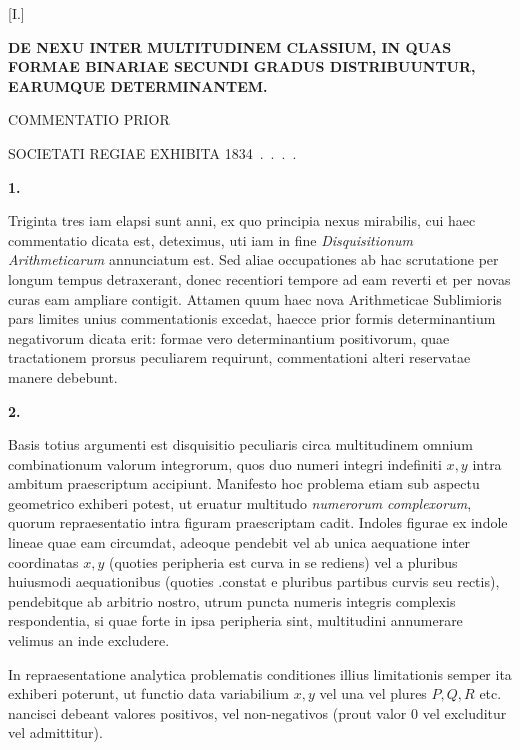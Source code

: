 \clearpage
{}
\renewcommand{\BookRunningTitle}{De nexu inter multitudinem classium}
\renewcommand{\Article}[1]{\par\medskip\Needspace{4\baselineskip}\pdfbookmark[1]{Art. #1}{nexus-prior-art-#1}\centerline{\textbf{#1.}}\nobreak\smallskip}
\begin{center}
[I.]\par\medskip
\Large\bfseries DE NEXU INTER MULTITUDINEM CLASSIUM, IN QUAS FORMAE BINARIAE SECUNDI GRADUS DISTRIBUUNTUR, EARUMQUE DETERMINANTEM.\par\medskip
\normalsize COMMENTATIO PRIOR\par\medskip
SOCIETATI REGIAE EXHIBITA 1834\ .\ .\ .\ .
\end{center}

\Article{1}
Triginta tres iam elapsi sunt anni, ex quo principia nexus mirabilis, cui haec commentatio dicata est, deteximus, uti iam in fine \emph{Disquisitionum Arithmeticarum} annunciatum est. Sed aliae occupationes ab hac scrutatione per longum tempus detraxerant, donec recentiori tempore ad eam reverti et per novas curas eam ampliare contigit. Attamen quum haec nova Arithmeticae Sublimioris pars limites unius commentationis excedat, haecce prior formis determinantium negativorum dicata erit: formae vero determinantium positivorum, quae tractationem prorsus peculiarem requirunt, commentationi alteri reservatae manere debebunt.

\Article{2}
Basis totius argumenti est disquisitio peculiaris circa multitudinem omnium combinationum valorum integrorum, quos duo numeri integri indefiniti $x,y$ intra ambitum praescriptum accipiunt. Manifesto hoc problema etiam sub aspectu geometrico exhiberi potest, ut eruatur multitudo \emph{numerorum complexorum}, quorum repraesentatio intra figuram praescriptam cadit. Indoles figurae ex indole lineae quae eam circumdat, adeoque pendebit vel ab unica aequatione inter coordinatas $x,y$ (quoties peripheria est curva in se rediens) vel a pluribus huiusmodi 
aequationibus (quoties .constat e pluribus partibus curvis seu rectis), pendebitque ab arbitrio nostro, utrum puncta numeris integris complexis respondentia, si quae forte in ipsa peripheria sint, multitudini annumerare velimus an inde excludere.

In repraesentatione analytica problematis conditiones illius limitationis semper ita exhiberi poterunt, ut functio data variabilium $x,y$ vel una vel plures $P,Q,R$ etc. nancisci debeant valores positivos, vel non-negativos (prout valor $0$ vel excluditur vel admittitur).


